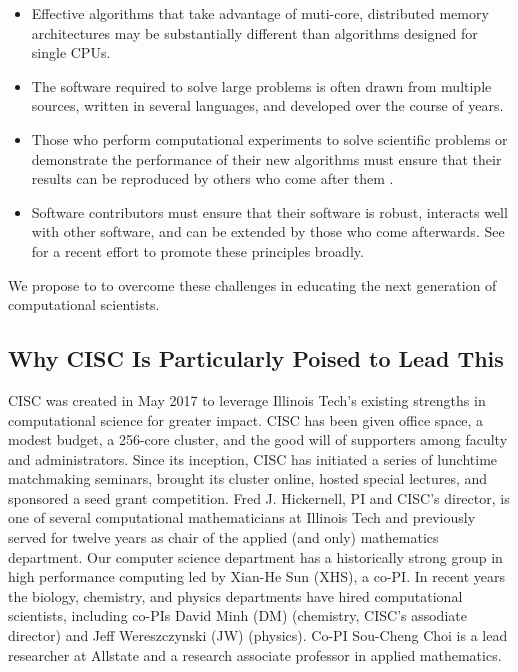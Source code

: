 \documentclass[11pt]{NSFamsart}
\begin{document}
\begin{itemize}

\item Effective algorithms that take advantage of muti-core, distributed memory architectures may be substantially different than algorithms designed for single CPUs.

\item The software required to solve large problems is often drawn from multiple sources, written in several languages, and developed over the course of years.

\item Those who perform computational experiments to solve scientific problems or demonstrate the performance of their new algorithms must ensure that their results can be reproduced by others who come after them \cite{Pen11}.  

\item Software contributors must ensure that their software is robust, interacts well with other software, and can be extended by those who come afterwards.  See \cite{BSS18} for a recent effort to promote these principles broadly.

\end{itemize}

We propose to to overcome these challenges in educating the next generation of computational scientists.

\subsection{Why CISC Is Particularly Poised to Lead This}
CISC was created in May 2017 to leverage Illinois Tech’s existing strengths in computational science for greater impact.  CISC has been given office space, a modest budget, a 256-core cluster, and the good will of supporters among faculty and administrators.  Since its inception, CISC has initiated a series of lunchtime matchmaking seminars, brought its cluster online, hosted special lectures, and sponsored a seed grant competition. Fred J. Hickernell, PI and CISC’s director, is one of several computational mathematicians at Illinois Tech and previously served for twelve years as chair of the applied (and only) mathematics department.  Our computer science department has a historically strong group in high performance computing led by Xian-He Sun (XHS), a co-PI.  In recent years the biology, chemistry, and physics departments have hired computational scientists, including co-PIs David Minh (DM) (chemistry, CISC's assodiate director) and Jeff Wereszczynski (JW) (physics).  Co-PI Sou-Cheng Choi is a lead researcher at Allstate and a research associate professor in applied mathematics.
\end{document}

